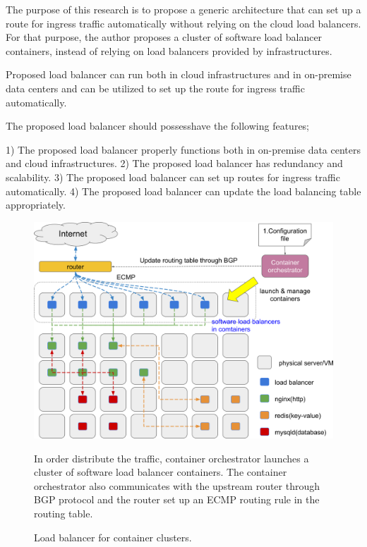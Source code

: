   The purpose of this research is to propose a generic architecture that can set up a route for ingress traffic automatically without relying on the cloud load balancers.
  For that purpose, the author proposes a cluster of software load balancer containers, instead of relying on load balancers provided by infrastructures.

  Proposed load balancer can run both in cloud infrastructures and in on-premise data centers and can be utilized to set up the route for ingress traffic automatically.


  The proposed load balancer should possess{have} the following features;

%
1) The proposed load balancer properly functions both in on-premise data centers and cloud infrastructures.
2) The proposed load balancer has redundancy and scalability.
3) The proposed load balancer can set up routes for ingress traffic automatically.
4) The proposed load balancer can update the load balancing table appropriately.




\begin{figure}[h]
\begin{center}
\includegraphics[width=0.9\columnwidth]{Figs/cluster_of_container_loadbalancer}
\end{center}
\caption{
Load balancer for container clusters.
}
\centering\parbox[c]{0.9\columnwidth}{
In order distribute the traffic, container orchestrator launches a cluster of software load balancer containers. 
The container orchestrator also communicates with the upstream router through BGP protocol and the router set up an ECMP routing rule in the routing table.
}
\label{fig:cluster_of_container_loadbalancer}
\end{figure}

